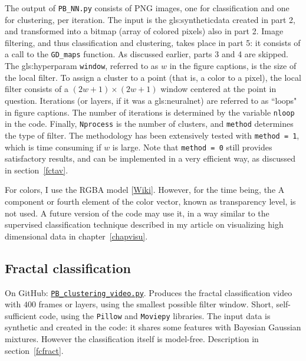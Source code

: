 \documentclass[oneside,10pt]{book}
\begin{document}
The output of  \texttt{PB\_NN.py} consists of PNG images, one for classification and one for clustering, per iteration. The input is the \gls{gls:syntheticdata} created in part 2, and transformed into a bitmap (array of colored pixels) also in part 2. Image filtering, and thus classification and clustering, takes place in part 5: it consists of a call to the \texttt{GD\_maps} function. As discussed earlier, parts 3 and 4 are skipped. The \gls{gls:hyperparam} \texttt{window}, referred to as $w$ in the figure captions, is the size of the local filter. To assign a cluster to a point (that is, a color to a pixel), the local filter consists of a $(2w+1)\times(2w+1)$ window centered at the point in question.
Iterations (or layers, if it was a \gls{gls:neuralnet}) are referred to as ``loops" in figure captions. The number of iterations
is determined by the variable \texttt{nloop} in the code. Finally, \texttt{Nprocess} is the number of clusters, and \texttt{method} determines the type of filter. The methodology has been extensively tested with \texttt{method = 1}, which is time consuming if
$w$ is large. Note that \texttt{method = 0} still provides satisfactory results, and can be implemented in a very efficient way,
as discussed in section~\ref{fctav}.

For colors, I use the \textcolor{index}{RGBA} model [\href{https://en.wikipedia.org/wiki/RGBA_color_model}{Wiki}]. However, for the time being, the A component or fourth element of the color vector, known as transparency level, is not used. A future version of the code may use it, in a way similar to the supervised classification technique described in my article on visualizing 
high dimensional data in chapter~\ref{chapvisu}. 

\subsection{Fractal classification}\label{pyfc1}
 
On GitHub: \href{https://github.com/VincentGranville/Point-Processes/blob/main/Videos/PB_clustering_video.py}{\texttt{PB\_clustering\_video.py}}. Produces the fractal classification video with $400$ frames or layers, using the smallest possible filter window. Short, self-sufficient code, using the \texttt{Pillow} and \texttt{Moviepy} libraries. The input data is synthetic and created in the code: it shares some features with Bayesian Gaussian mixtures. However the classification itself is model-free. Description in section~\ref{fcfract}.  
\end{document}
